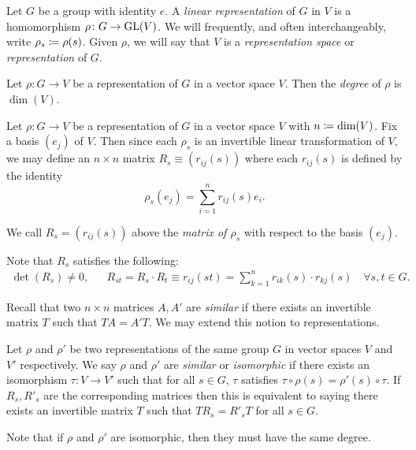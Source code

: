 \documentclass[letterpaper, 11pt, oneside]{book}
\begin{document}
\begin{defn}
  Let $G$ be a group with identity $e$.
  A \emph{linear representation} of $G$ in $V$ is a homomorphism $\rho\colon G \to \operatorname{GL}(V)$.
  We will frequently, and often interchangeably, write $\rho_{s} \coloneqq \rho(s)$.
  Given $\rho$, we will say that $V$ is a \emph{representation space} or \emph{representation} of $G$.
\end{defn}

\begin{defn}[Degree]
  Let $\rho\colon G \to V$ be a representation of $G$ in a vector space $V$.
  Then the \emph{degree} of $\rho$ is $\dim(V)$.
\end{defn}

Let $\rho\colon G \to V$ be a representation of $G$ in a vector space $V$ with $n \coloneqq \dim(V)$.
Fix a basis $(e_{j})$ of $V$.
Then since each $\rho_{s}$ is an invertible linear transformation of $V$, we may define an $n \times n$ matrix $R_{s} \equiv (r_{ij}(s))$ where each $r_{ij}(s)$ is defined by the identity
\[
  \rho_{s}(e_{j}) = \sum_{i = 1}^{n} r_{ij}(s) e_{i}.
\]

\begin{defn}
  We call $R_{s} = (r_{ij}(s))$ above the \emph{matrix of $\rho_{s}$} with respect to the basis $(e_{j})$.
\end{defn}
Note that $R_{s}$ satisfies the following:
\begin{align*}
  \det(R_{s}) \neq 0, && R_{st} = R_{s} \cdot R_{t} \equiv r_{ij}(st) = \sum_{k = 1}^{n} r_{ik}(s) \cdot r_{kj}(s) \quad \forall s, t \in G.
\end{align*}

\clearpage

Recall that two $n \times n$ matrices $A, A'$ are \emph{similar} if there exists an invertible matrix $T$ such that $T A = A' T$.
We may extend this notion to representations.
\begin{defn}
  Let $\rho$ and $\rho'$ be two representations of the same group $G$ in vector spaces $V$ and $V'$ respectively.
  We say $\rho$ and $\rho'$ are \emph{similar} or \emph{isomorphic} if there exists an isomorphism $\tau \colon V \to V'$ such that for all $s \in G$, $\tau$ satisfies $\tau \circ \rho(s) = \rho'(s) \circ \tau$.
  If $R_{s}, R'_{s}$ are the corresponding matrices then this is equivalent to saying there exists an invertible matrix $T$ such that $T R_{s} = R'_{s} T$ for all $s \in G$.
\end{defn}
Note that if $\rho$ and $\rho'$ are isomorphic, then they must have the same degree.
\end{document}
